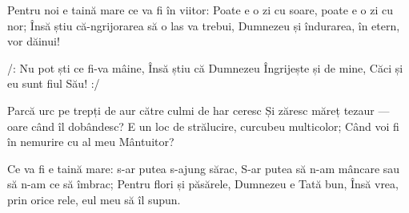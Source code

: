 \beginverse
Pentru noi e taină mare ce va fi în viitor:
Poate e o zi cu soare, poate e o zi cu nor;
Însă știu că-ngrijorarea să o las va trebui,
Dumnezeu și îndurarea, în etern, vor dăinui!
\endverse

\beginchorus
/: Nu pot ști ce fi-va mâine,
Însă știu că Dumnezeu
Îngrijește și de mine,
Căci și eu sunt fiul Său! :/
\endchorus

\beginverse
Parcă urc pe trepți de aur către culmi de har ceresc
Și zăresc măreț tezaur — oare când îl dobândesc?
E un loc de strălucire, curcubeu multicolor;
Când voi fi în nemurire cu al meu Mântuitor?
\endverse

\beginverse
Ce va fi e taină mare: s-ar putea s-ajung sărac,
S-ar putea să n-am mâncare sau să n-am ce să îmbrac;
Pentru flori și păsărele, Dumnezeu e Tată bun,
Însă vrea, prin orice rele, eul meu să îl supun.
\endverse
\endsong
